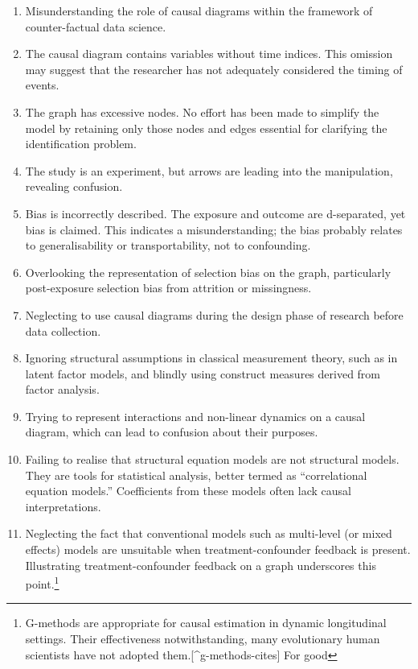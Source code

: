 \documentclass[
  singlecolumn]{article}
\begin{document}
\begin{enumerate}
\def\labelenumi{\arabic{enumi}.}
\item
  Misunderstanding the role of causal diagrams within the framework of
  counter-factual data science.
\item
  The causal diagram contains variables without time indices. This
  omission may suggest that the researcher has not adequately considered
  the timing of events.
\item
  The graph has excessive nodes. No effort has been made to simplify the
  model by retaining only those nodes and edges essential for clarifying
  the identification problem.
\item
  The study is an experiment, but arrows are leading into the
  manipulation, revealing confusion.
\item
  Bias is incorrectly described. The exposure and outcome are
  d-separated, yet bias is claimed. This indicates a misunderstanding;
  the bias probably relates to generalisability or transportability, not
  to confounding.
\item
  Overlooking the representation of selection bias on the graph,
  particularly post-exposure selection bias from attrition or
  missingness.
\item
  Neglecting to use causal diagrams during the design phase of research
  before data collection.
\item
  Ignoring structural assumptions in classical measurement theory, such
  as in latent factor models, and blindly using construct measures
  derived from factor analysis.
\item
  Trying to represent interactions and non-linear dynamics on a causal
  diagram, which can lead to confusion about their purposes.
\item
  Failing to realise that structural equation models are not structural
  models. They are tools for statistical analysis, better termed as
  ``correlational equation models.'' Coefficients from these models
  often lack causal interpretations.
\item
  Neglecting the fact that conventional models such as multi-level (or
  mixed effects) models are unsuitable when treatment-confounder
  feedback is present. Illustrating treatment-confounder feedback on a
  graph underscores this point.\footnote{G-methods are appropriate for
    causal estimation in dynamic longitudinal settings. Their
    effectiveness notwithstanding, many evolutionary human scientists
    have not adopted them.{[}\^{}g-methods-cites{]} For good
}
\end{enumerate}
\end{document}
